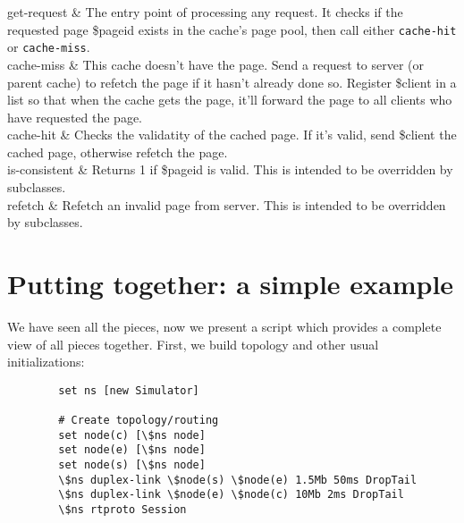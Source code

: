\begin{\par\tabular{\textwidth}{rX}}
get-request    & 
The entry point of processing any request. It checks if the requested 
page \$pageid exists in the cache's page pool, then call either 
{\tt cache-hit} or {\tt cache-miss}. \\

cache-miss    & 
This cache doesn't have the page. Send a request to server (or parent 
cache) to refetch the page if it hasn't already done so. Register 
\$client in a list so that when the cache gets the page, it'll forward
the page to all clients who have requested the page. \\

cache-hit    &
Checks the validatity of the cached page. If it's valid, send \$client
the cached page, otherwise refetch the page. \\ 

is-consistent    & 
Returns 1 if \$pageid is valid. This is intended to be overridden by 
subclasses. \\

refetch    & 
Refetch an invalid page from server. This is intended to be overridden 
by subclasses. \\
\end{\par\tabular{\textwidth}{rX}}


\section{Putting together: a simple example}
\label{sec:webcache-example}

We have seen all the pieces, now we present a script which provides a
complete view of all pieces together. First, we build topology and 
other usual initializations:

\begin{verbatim}
        set ns [new Simulator]

        # Create topology/routing
        set node(c) [\$ns node] 
        set node(e) [\$ns node]
        set node(s) [\$ns node]
        \$ns duplex-link \$node(s) \$node(e) 1.5Mb 50ms DropTail
        \$ns duplex-link \$node(e) \$node(c) 10Mb 2ms DropTail 
        \$ns rtproto Session
\end{verbatim}

